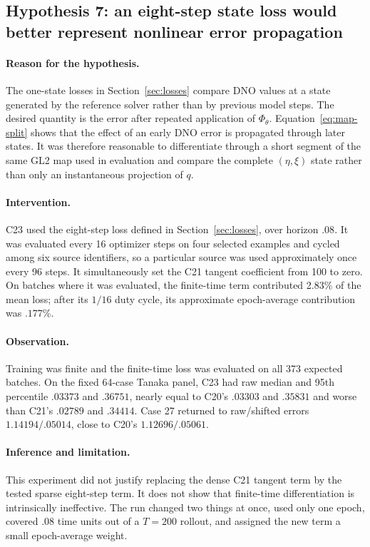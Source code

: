 \documentclass[11pt]{article}
\begin{document}
\subsection{Hypothesis 7: an eight-step state loss would better represent
nonlinear error propagation}

\paragraph{Reason for the hypothesis.}
The one-state losses in Section~\ref{sec:losses} compare DNO values at a state
generated by the reference solver rather than by previous model steps.  The
desired quantity is the error after repeated
application of $\Phi_\theta$.  Equation~\eqref{eq:map-split} shows that the
effect of an early DNO error is propagated through later states.  It was
therefore reasonable to differentiate through a short segment of the same
GL2 map used in evaluation and compare the complete $(\eta,\xi)$ state rather
than only an instantaneous projection of $q$.

\paragraph{Intervention.}
C23 used the eight-step loss defined in Section~\ref{sec:losses}, over horizon
$.08$.  It was evaluated every 16 optimizer steps on four selected examples and
cycled among six source identifiers, so a particular source was used
approximately once every 96 steps.  It simultaneously set the C21 tangent
coefficient from 100 to zero.  On batches where it was evaluated, the finite-time term
contributed 2.83\% of the mean loss; after its $1/16$ duty cycle, its
approximate epoch-average contribution was $.177$\%.

\paragraph{Observation.}
Training was finite and the finite-time loss was evaluated on all 373 expected batches.  On the
fixed 64-case Tanaka panel, C23 had raw median and 95th percentile $.03373$ and
$.36751$, nearly equal to C20's $.03303$ and $.35831$ and worse than C21's
$.02789$ and $.34414$.  Case 27 returned to raw/shifted errors
$1.14194/.05014$, close to C20's $1.12696/.05061$.

\paragraph{Inference and limitation.}
This experiment did not justify replacing the dense C21 tangent term by the
tested sparse eight-step term.  It does not show that finite-time
differentiation is intrinsically ineffective.  The run changed two things at
once, used only one epoch, covered $.08$ time units out of a $T=200$ rollout,
and assigned the new term a small epoch-average weight.
\end{document}
